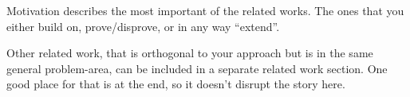 Motivation describes the most important of the related works. The ones that 
you either build on, prove/disprove, or in any way ``extend''. 

Other related work, that is orthogonal to your approach but is in the same
general problem-area, can be included in a separate related work section.
One good place for that is at the end, so it doesn't disrupt the story here.
